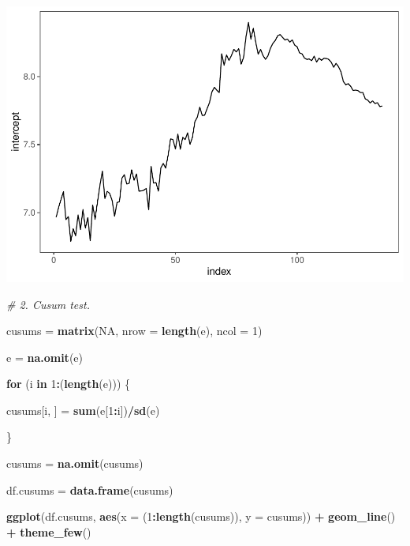 \documentclass[
]{article}
\newenvironment{Shaded}{\begin{snugshade}}{\end{snugshade}}
\newcommand{\CommentTok}[1]{\textcolor[rgb]{0.56,0.35,0.01}{\textit{#1}}}
\newcommand{\ControlFlowTok}[1]{\textcolor[rgb]{0.13,0.29,0.53}{\textbf{#1}}}
\newcommand{\DataTypeTok}[1]{\textcolor[rgb]{0.13,0.29,0.53}{#1}}
\newcommand{\DecValTok}[1]{\textcolor[rgb]{0.00,0.00,0.81}{#1}}
\newcommand{\KeywordTok}[1]{\textcolor[rgb]{0.13,0.29,0.53}{\textbf{#1}}}
\newcommand{\NormalTok}[1]{#1}
\newcommand{\OperatorTok}[1]{\textcolor[rgb]{0.81,0.36,0.00}{\textbf{#1}}}
\newcommand{\OtherTok}[1]{\textcolor[rgb]{0.56,0.35,0.01}{#1}}
\newcommand{\StringTok}[1]{\textcolor[rgb]{0.31,0.60,0.02}{#1}}
\begin{document}
\begin{center}\includegraphics{Econo2_P7_files/figure-latex/all-3} \end{center}

\begin{Shaded}
\begin{Highlighting}[]
\CommentTok{# 2. Cusum test.}

\NormalTok{cusums =}\StringTok{ }\KeywordTok{matrix}\NormalTok{(}\OtherTok{NA}\NormalTok{, }\DataTypeTok{nrow =} \KeywordTok{length}\NormalTok{(e), }\DataTypeTok{ncol =} \DecValTok{1}\NormalTok{)}

\NormalTok{e =}\StringTok{ }\KeywordTok{na.omit}\NormalTok{(e)}

\ControlFlowTok{for}\NormalTok{ (i }\ControlFlowTok{in} \DecValTok{1}\OperatorTok{:}\NormalTok{(}\KeywordTok{length}\NormalTok{(e))) \{}
    
\NormalTok{    cusums[i, ] =}\StringTok{ }\KeywordTok{sum}\NormalTok{(e[}\DecValTok{1}\OperatorTok{:}\NormalTok{i])}\OperatorTok{/}\KeywordTok{sd}\NormalTok{(e)}
    
\NormalTok{\}}


\NormalTok{cusums =}\StringTok{ }\KeywordTok{na.omit}\NormalTok{(cusums)}

\NormalTok{df.cusums =}\StringTok{ }\KeywordTok{data.frame}\NormalTok{(cusums)}

\KeywordTok{ggplot}\NormalTok{(df.cusums, }\KeywordTok{aes}\NormalTok{(}\DataTypeTok{x =}\NormalTok{ (}\DecValTok{1}\OperatorTok{:}\KeywordTok{length}\NormalTok{(cusums)), }\DataTypeTok{y =}\NormalTok{ cusums)) }\OperatorTok{+}\StringTok{ }
\StringTok{    }\KeywordTok{geom_line}\NormalTok{() }\OperatorTok{+}\StringTok{ }\KeywordTok{theme_few}\NormalTok{()}
\end{Highlighting}
\end{Shaded}
\end{document}
